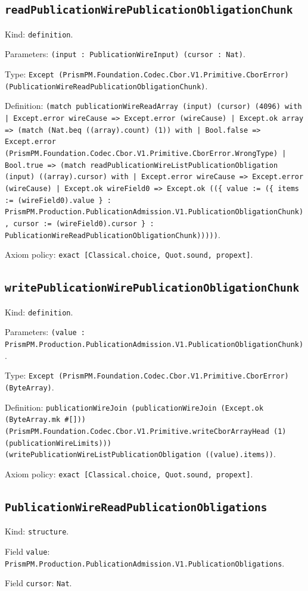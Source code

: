 \documentclass[11pt]{article}
\begin{document}
\subsection*{\texttt{readPublicationWirePublicationObligationChunk}}
\noindent Kind: \texttt{definition}.\par
\noindent Parameters: \texttt{(input : PublicationWireInput) (cursor : Nat)}.\par
\noindent Type: \texttt{Except (PrismPM.Foundation.Codec.Cbor.V1.Primitive.CborError) (PublicationWireReadPublicationObligationChunk)}.\par
\noindent Definition: \texttt{(match publicationWireReadArray (input) (cursor) (4096) with | Except.error wireCause => Except.error (wireCause) | Except.ok array => (match (Nat.beq ((array).count) (1)) with | Bool.false => Except.error (PrismPM.Foundation.Codec.Cbor.V1.Primitive.CborError.WrongType) | Bool.true => (match readPublicationWireListPublicationObligation (input) ((array).cursor) with | Except.error wireCause => Except.error (wireCause) | Except.ok wireField0 => Except.ok ((\{ value := (\{ items := (wireField0).value \} : PrismPM.Production.PublicationAdmission.V1.PublicationObligationChunk), cursor := (wireField0).cursor \} : PublicationWireReadPublicationObligationChunk)))))}.\par
\noindent Axiom policy: \texttt{exact [Classical.choice, Quot.sound, propext]}.\par
\subsection*{\texttt{writePublicationWirePublicationObligationChunk}}
\noindent Kind: \texttt{definition}.\par
\noindent Parameters: \texttt{(value : PrismPM.Production.PublicationAdmission.V1.PublicationObligationChunk)}.\par
\noindent Type: \texttt{Except (PrismPM.Foundation.Codec.Cbor.V1.Primitive.CborError) (ByteArray)}.\par
\noindent Definition: \texttt{publicationWireJoin (publicationWireJoin (Except.ok (ByteArray.mk \#[])) (PrismPM.Foundation.Codec.Cbor.V1.Primitive.writeCborArrayHead (1) (publicationWireLimits))) (writePublicationWireListPublicationObligation ((value).items))}.\par
\noindent Axiom policy: \texttt{exact [Classical.choice, Quot.sound, propext]}.\par
\subsection*{\texttt{PublicationWireReadPublicationObligations}}
\noindent Kind: \texttt{structure}.\par
\noindent Field \texttt{value}: \texttt{PrismPM.Production.PublicationAdmission.V1.PublicationObligations}.\par
\noindent Field \texttt{cursor}: \texttt{Nat}.\par
\end{document}
